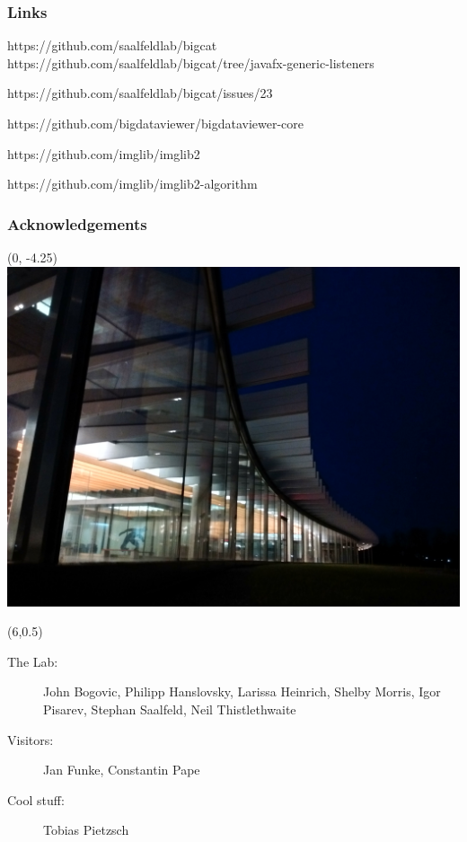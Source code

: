 \documentclass[aspectratio=169,table]{beamer}
\begin{document}
\begin{frame}
    \frametitle{Links}
    \centering
    \scriptsize
    \begin{description}[leftmargin=3.5cm,style=multiline,font=\scriptsize]
          \item[BigCAT] https://github.com/saalfeldlab/bigcat
               https://github.com/saalfeldlab/bigcat/tree/javafx-generic-listeners
          \item[Rename BigCAT] https://github.com/saalfeldlab/bigcat/issues/23
          \item[BigDataViewer] https://github.com/bigdataviewer/bigdataviewer-core
          \item[imglib2] https://github.com/imglib/imglib2
          \item[imglib2-algorithm] https://github.com/imglib/imglib2-algorithm
    \end{description}
\end{frame}

\begin{frame}
    \frametitle{Acknowledgements}
    \begin{textblock}{16}(0, -4.25) 
        \includegraphics[width=\textwidth]{fig/janelia.jpg}
    \end{textblock}%
    \begin{textblock}{9.8}(6,0.5)
        \scriptsize%
        \begin{description}
              \item[The Lab:]{\color{white}John Bogovic, Philipp Hanslovsky, Larissa Heinrich, Shelby Morris, Igor Pisarev, Stephan Saalfeld, Neil Thistlethwaite}
              \item[Visitors:]{\color{white}Jan Funke, Constantin Pape}
              \item[Cool stuff:]{\color{white}Tobias Pietzsch}
\end{description}
\end{textblock}
\end{frame}

    
\end{document}
